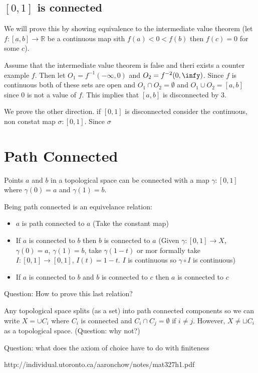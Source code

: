 \documentclass{homework}
\newcommand{\RR}{\mathbb{R}}
\begin{document}
\subsection{$[0,1]$ is connected}

We will prove this by showing equivalence to the intermediate value theorem (let $f:[a,b] \rightarrow \RR$ be a continuous map sith $f(a) < 0 < f(b)$ then $f(c) = 0$ for some $c$). 


Assume that the intermediate value theorem is false and theri exists a counter example $f$. Then let $O_1 = f^{-1}(-\infty,0)$ and $O_2 = f^{-2}(0,\infy)$. Since $f$ is continuous both of these sets are open and $O_1 \cap O_2 = \emptyset$ and $O_1 \cup O_2 = [a,b]$ since $0$ is not a value of $f$. This implies that $[a,b]$ is disconnected by $3$.

We prove the other direction. if $[0,1]$ is disconnected consider the continuous, non constat map $\sigma: [0,1]$. Since $\sigma$ 




\section{Path Connected}
Points $a$ and $b$ in a topological space can be connected with a map $\gamma : [0,1]$ where $\gamma(0) = a$ and $\gamma(1) = b$. 

Being path connected is an equivelance relation:
\begin{itemize}
    \item $a$ is path connected to $a$ (Take the constant map)
    \item If $a$ is connected to $b$ then $b$ is connected to $a$ (Given $\gamma : [0,1] \rightarrow X$, $\gamma (0) = a$, $\gamma (1) = b$, take $\gamma (1-t)$ or mor formally take $I : [0,1] \rightarrow [0,1]$, $I(t) = 1- t$. $I$ is continuous so $\gamma \circ I$ is continuous)
    \item If $a$ is connected to $b$ and $b$ is connected to $c$ then $a$ is connected to $c$

\end{itemize}

Question: How to prove this last relation?


Any topological space splits (as a set) into path connected components so we can write $X = \cup C_i$ where $C_i$ is connected and $C_i \cap C_j = \emptyset$ if $i \neq j$. However, $X \neq \sqcup C_i$ as a topological space. (Question: why not?)

Question: what does the axiom of choice have to do with finiteness



http://individual.utoronto.ca/aaronchow/notes/mat327h1.pdf 
\end{document}
